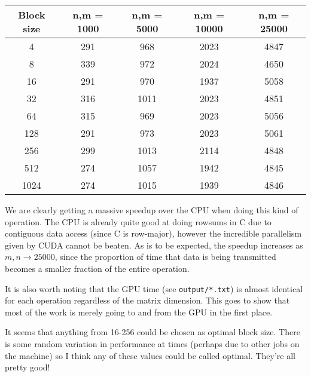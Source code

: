 \documentclass[a4paper, fleqn]{article}
\begin{document}
        \begin{center}
 \begin{tabular}{||c | c | c | c | c ||}
 \hline
 Block size & n,m = 1000 & n,m = 5000 & n,m = 10000 & n,m = 25000 \\ [0.5ex] 
 \hline
 4 & 291 & 968 & 2023 & 4847 \\
 \hline
 8 & 339 & 972 & 2024 & 4650 \\
 \hline
 16 & 291 & 970 & 1937 & 5058 \\
 \hline
 32 & 316 & 1011 & 2023 & 4851 \\
 \hline
 64 & 315 & 969 & 2023 & 5056 \\
 \hline
 128 & 291 & 973 & 2023 & 5061 \\
 \hline
 256 & 299 & 1013 & 2114 & 4848 \\
 \hline
 512 & 274 & 1057 & 1942 & 4845 \\
 \hline
 1024 & 274 & 1015 & 1939 & 4846 \\
 \hline

 \hline
\end{tabular}
\end{center}
We are clearly getting a massive speedup over the CPU when doing this kind of operation. The CPU is already quite good at doing rowsums in C due to contiguous data access (since C is row-major), however the incredible parallelism given by CUDA cannot be beaten. As is to be expected, the speedup increases as $m,n \to 25000$, since the proportion of time that data is being transmitted becomes a smaller fraction of the entire operation.

It is also worth noting that the GPU time (see \texttt{output/*.txt}) is almost identical for each operation regardless of the matrix dimension. This goes to show that most of the work is merely going to and from the GPU in the first place. 

It seems that anything from 16-256 could be chosen as optimal block size. There is some random variation in performance at times (perhaps due to other jobs on the machine) so I think any of these values could be called optimal. They're all pretty good!
\end{document}
